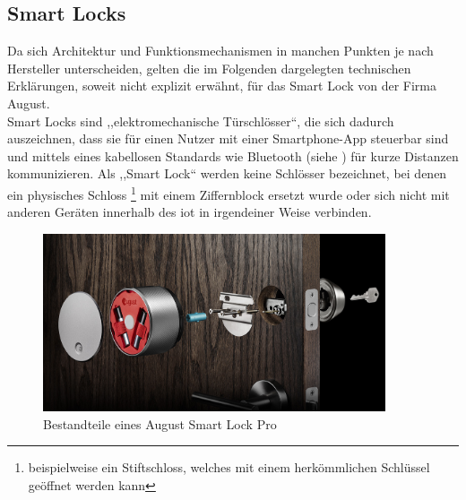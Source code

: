 \subsection{Smart Locks}
\label{sec:sota_smart_locks}
	Da sich Architektur und Funktionsmechanismen in manchen Punkten je nach Hersteller unterscheiden, gelten die im Folgenden dargelegten technischen Erklärungen, soweit nicht explizit erwähnt, für das Smart Lock von der Firma August. 
    \medskip\\
    \noindent Smart Locks sind ,,elektromechanische Türschlösser``, die sich dadurch auszeichnen, dass sie für einen Nutzer mit einer Smartphone-App steuerbar sind und mittels eines kabellosen Standards wie Bluetooth (siehe ) für kurze Distanzen kommunizieren.
	Als ,,Smart Lock`` werden keine Schlösser bezeichnet, bei denen ein physisches Schloss
	\footnote{beispielweise ein Stiftschloss, welches mit einem herkömmlichen Schlüssel geöffnet werden kann} 
	mit einem Ziffernblock ersetzt wurde oder sich nicht mit anderen Geräten innerhalb des \gls{iot} in irgendeiner Weise verbinden.\cite{Ho2016}
	
	\begin{figure}[H]
		\centering
		\includegraphics[width=0.9\textwidth]{graphics/august_2.jpg}
		\caption[Bestandteile eines August Smart Lock Pro]{Bestandteile eines August Smart Lock Pro\cite{August}}
		\label{fig:august1}
	\end{figure}
	
